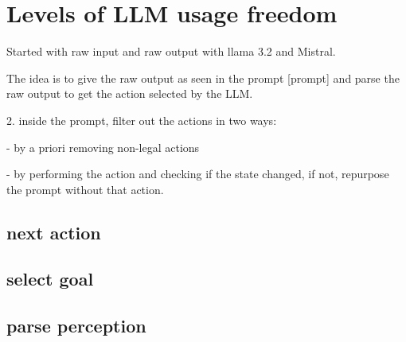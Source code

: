 \chapter{Levels of LLM usage freedom}
Started with raw input and raw output with llama 3.2 and Mistral.

The idea is to give the raw output as seen in the prompt [prompt] and parse the raw
output to get the action selected by the LLM.

2. inside the prompt, filter out the actions in two ways:

- by a priori removing non-legal actions

- by performing the action and checking if the state changed, if not, repurpose the
prompt without that action.

\section{next action}
\lipsum[1]
\section{select goal}
\lipsum[1]
\section{parse perception}

\lipsum[1]
